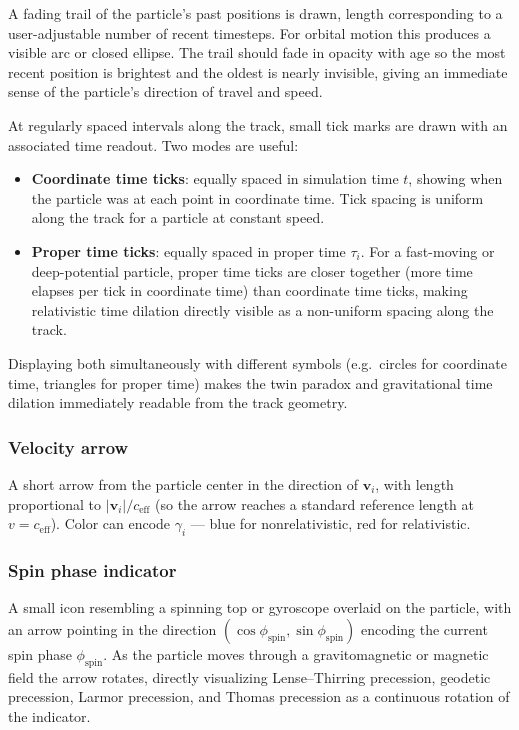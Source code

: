 \documentclass[11pt,a4paper]{article}
\newcommand{\vv}[1]{\mathbf{#1}}
\begin{document}
A fading trail of the particle's past positions is drawn, length corresponding to a user-adjustable number of recent timesteps.  For orbital motion this produces a visible arc or closed ellipse.  The trail should fade in opacity with age so the most recent position is brightest and the oldest is nearly invisible, giving an immediate sense of the particle's direction of travel and speed.

At regularly spaced intervals along the track, small tick marks are drawn with an associated time readout.  Two modes are useful:
\begin{itemize}
  \item \textbf{Coordinate time ticks}: equally spaced in simulation time $t$, showing when the particle was at each point in coordinate time.  Tick spacing is uniform along the track for a particle at constant speed.
  \item \textbf{Proper time ticks}: equally spaced in proper time $\tau_i$.  For a fast-moving or deep-potential particle, proper time ticks are closer together (more time elapses per tick in coordinate time) than coordinate time ticks, making relativistic time dilation directly visible as a non-uniform spacing along the track.
\end{itemize}
Displaying both simultaneously with different symbols (e.g.\ circles for coordinate time, triangles for proper time) makes the twin paradox and gravitational time dilation immediately readable from the track geometry.

\subsubsection*{Velocity arrow}

A short arrow from the particle center in the direction of $\vv{v}_i$, with length proportional to $|\vv{v}_i|/c_{\mathrm{eff}}$ (so the arrow reaches a standard reference length at $v = c_{\mathrm{eff}}$).  Color can encode $\gamma_i$ --- blue for nonrelativistic, red for relativistic.

\subsubsection*{Spin phase indicator}

A small icon resembling a spinning top or gyroscope overlaid on the particle, with an arrow pointing in the direction $(\cos\phi_{\mathrm{spin}}, \sin\phi_{\mathrm{spin}})$ encoding the current spin phase $\phi_{\mathrm{spin}}$.  As the particle moves through a gravitomagnetic or magnetic field the arrow rotates, directly visualizing Lense--Thirring precession, geodetic precession, Larmor precession, and Thomas precession as a continuous rotation of the indicator.
\end{document}
